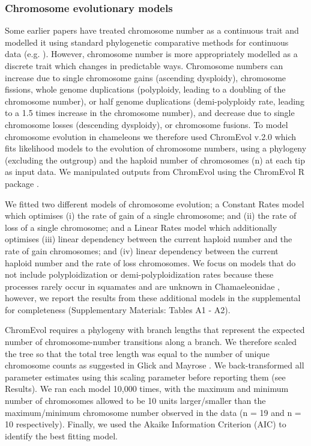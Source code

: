 \documentclass[a4paper, 12pt]{article}
\begin{document}
\subsubsection{Chromosome evolutionary models}
Some earlier papers have treated chromosome number as a continuous trait and modelled it using standard phylogenetic comparative methods for continuous data (e.g. \citealt{vershinina2017evolutionary}). 
However, chromosome number is more appropriately modelled as a discrete trait which changes in predictable ways. 
Chromosome numbers can increase due to single chromosome gains (ascending dysploidy), chromosome fissions, whole genome duplications (polyploidy, leading to a doubling of the chromosome number), or half genome duplications (demi-polyploidy rate, leading to a 1.5 times increase in the chromosome number), and decrease due to single chromosome losses (descending dysploidy), or chromosome fusions. 
To model chromosome evolution in chameleons we therefore used ChromEvol v.2.0 \citep{glick2014chromevol,mayrose2010probabilistic} which fits likelihood models to the evolution of chromosome numbers, using a phylogeny (excluding the outgroup) and the haploid number of chromosomes (n) at each tip as input data. 
We manipulated outputs from ChromEvol using the ChromEvol R package \citep{chromevol}.

We fitted two different models of chromosome evolution; a Constant Rates model which optimises (i) the rate of gain of a single chromosome; and (ii) the rate of loss of a single chromosome; and a Linear Rates model which additionally optimises (iii) linear dependency between the current haploid number and the rate of gain chromosomes; and (iv) linear dependency between the current haploid number and the rate of loss chromosomes. 
We focus on models that do not include polyploidization or demi-polyploidization rates because these processes rarely occur in squamates and are unknown in Chamaeleonidae \citep{bogart1980evolutionary,mezzasalma2021lizards}, however, we report the results from these additional models in the supplemental for completeness (Supplementary Materials: Tables A1 - A2). 

ChromEvol requires a phylogeny with branch lengths that represent the expected number of chromosome-number transitions along a branch. We therefore scaled the tree so that the total tree length was equal to the number of unique chromosome counts as suggested in Glick and Mayrose \citeyear{glick2014chromevol}. 
We back-transformed all parameter estimates using this scaling parameter before reporting them (see Results). 
We ran each model 10,000 times, with the maximum and minimum number of chromosomes allowed to be 10 units larger/smaller than the maximum/minimum chromosome number observed in the data (n = 19 and n = 10 respectively). 
Finally, we used the Akaike Information Criterion (AIC) to identify the best fitting model. 
\end{document}
